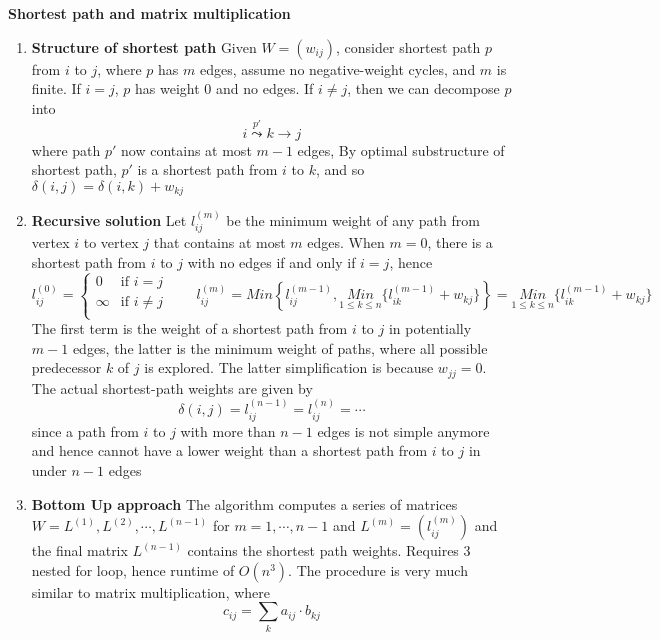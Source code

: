 \documentclass[11pt]{article}
\begin{document}
\begin{defn*}
    \textbf{Shortest path and matrix multiplication}
    \begin{enumerate}
        \item \textbf{Structure of shortest path} Given $W = (w_{ij})$, consider shortest path $p$ from $i$ to $j$, where $p$ has $m$ edges, assume no negative-weight cycles, and $m$ is finite. If $i=j$, $p$ has weight 0 and no edges. If $i\neq j$, then we can decompose $p$ into 
        \[
            i \overset{p'}{\leadsto} k \to j
        \]
        where path $p'$ now contains at most $m-1$ edges, By optimal substructure of shortest path, $p'$ is a shortest path from $i$ to $k$, and so $\delta(i,j) = \delta(i, k) + w_{kj}$
        \item \textbf{Recursive solution} Let $l_{ij}^{(m)}$ be the minimum weight of any path from vertex $i$ to vertex $j$ that contains at most $m$ edges. When $m = 0$, there is a shortest path from $i$ to $j$ with no edges if and only if $i = j$, hence 
        \[
            l_{ij}^{(0)} = 
            \begin{cases}
                0 & \text{if } i  = j\\
                \infty & \text{if } i\neq j \\
            \end{cases}
            \quad \quad 
            l_{ij}^{(m)} = Min\left\{ l_{ij}^{(m-1)}, \underset{1\leq k\leq n}{Min}\{ l_{ik}^{(m-1)} + w_{kj} \}  \right\} =  \underset{1\leq k\leq n}{Min}\{ l_{ik}^{(m-1)} + w_{kj} \} 
        \]
        The first term is the weight of a shortest path from $i$ to $j$ in potentially $m-1$ edges, the latter is the minimum weight of paths, where all possible predecessor $k$ of $j$ is explored. The latter simplification is because $w_{jj}= 0$. The actual shortest-path weights are given by
        \[
            \delta(i, j) = l_{ij}^{(n-1)} = l_{ij}^{(n)} = \cdots
        \]
        since a path from $i$ to $j$ with more than $n-1$ edges is not simple anymore and hence cannot have a lower weight than a shortest path from $i$ to $j$ in under $n-1$ edges
        \item \textbf{Bottom Up approach}
        The algorithm computes a series of matrices $W = L^{(1)}, L^{(2)}, \cdots, L^{(n-1)}$ for $m = 1,\cdots, n-1$ and $L^{(m)} = (l_{ij}^{(m)})$ and the final matrix $L^{(n-1)}$ contains the shortest path weights. Requires 3 nested for loop, hence runtime of $O(n^3)$. The procedure is very much similar to matrix multiplication, where 
        \[
            c_{ij} = \sum_{k} a_{ij} \cdot b_{kj}
\]
\end{enumerate}
\end{defn*}
\end{document}
